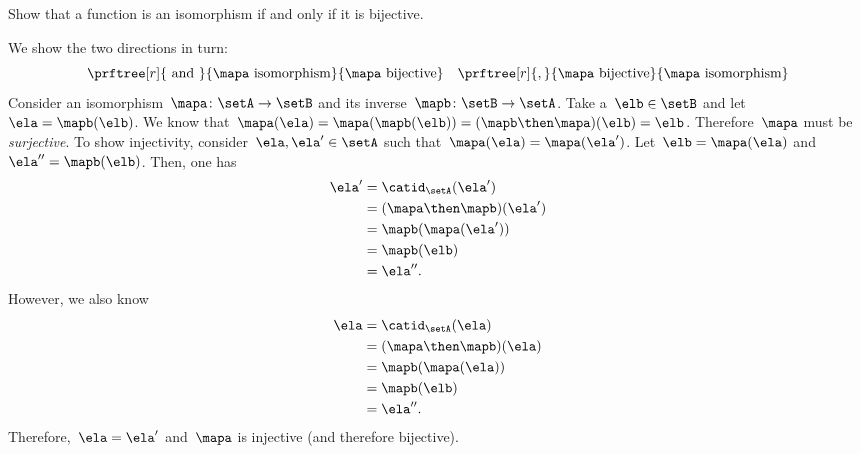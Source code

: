 \begin{exercise}
    \label{ex:bijective-functions-are-isomorphisms}
    Show that a function is an isomorphism if and only if it is bijective.
\end{exercise}
\begin{solution}
    We show the two directions in turn:
    \begin{equation*}
        \prftree[r]{\text{ and }}{\mapa \text{ isomorphism}}{\mapa \text{ bijective}} \quad \prftree[r]{,}{\mapa \text{ bijective}}{\mapa \text{ isomorphism}}
    \end{equation*}
    Consider an isomorphism~$\mapa\colon \setA \to \setB$ and its inverse~$\mapb\colon \setB\to \setA$.
    Take a~$\elb\in \setB$ and let~$\ela= \mapb(\elb)$.
    We know that~$\mapa(\ela)=\mapa(\mapb(\elb))=(\mapb\then \mapa)(\elb)=\elb$.
    Therefore~$\mapa$ must be \emph{surjective}.
    To show injectivity, consider~$\ela,\ela'\in \setA$ such that~$\mapa(\ela)=\mapa(\ela')$.
    Let~$\elb=\mapa(\ela)$ and~$\ela''=\mapb(\elb)$.
    Then, one has
    \begin{equation*}
        \begin{aligned}
            \ela' & =\catid_\setA(\ela') \\
                  & =(\mapa \then \mapb)(\ela') \\
                  & =\mapb(\mapa(\ela')) \\
                  & =\mapb(\elb) \\
                  & =\ela''.
        \end{aligned}
    \end{equation*}
    However, we also know
    \begin{equation*}
        \begin{aligned}
            \ela & =\catid_\setA(\ela) \\
                 & =(\mapa \then \mapb)(\ela) \\
                 & =\mapb(\mapa(\ela)) \\
                 & =\mapb(\elb) \\
                 & =\ela''.
        \end{aligned}
    \end{equation*}
    Therefore,~$\ela=\ela'$ and~$\mapa$ is injective (and therefore bijective).


\end{solution}
